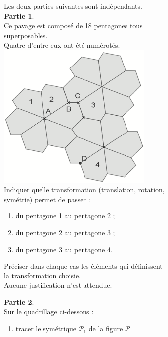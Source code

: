 \begin{exercice} %
   \begin{minipage}[t]{0.5\linewidth}
      Les deux parties suivantes sont indépendants. \\ [5mm]
      {\bf Partie 1}. \\
      Ce pavage est composé de 18 pentagones tous \\
      superposables. \\
      Quatre d'entre eux ont été numérotés. \\ [3mm]
      \includegraphics[width=7.5cm]{Geometrie/Images/G11_ex_transformations} \\ [3mm]
      Indiquer quelle transformation (translation, rotation, \\
      symétrie) permet de passer :
      \begin{enumerate}
         \item du pentagone 1 au pentagone 2 ;
         \item du pentagone 2 au pentagone 3 ;
         \item du pentagone 3 au pentagone 4.
      \end{enumerate}
      Préciser dans chaque cas les éléments qui définissent \\
      la transformation choisie. \\
      Aucune justification n'est attendue.
   \end{minipage}
   \begin{minipage}[t]{0.5\linewidth}
      {\bf Partie 2}. \\
      Sur le quadrillage ci-dessous :
      \begin{enumerate}
         \item tracer le symétrique $\mathcal{P}_1$ de la figure $\mathcal{P}$ \\

\end{enumerate}
\end{minipage}
\end{exercice}
